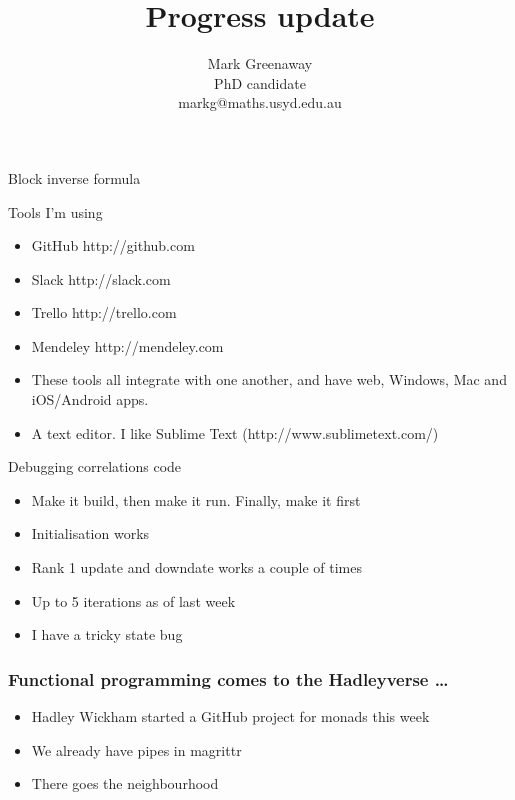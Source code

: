 \documentclass{beamer}
\title{Progress update}
\author{Mark Greenaway\\PhD candidate\\markg@maths.usyd.edu.au}
\begin{document}
\begin{frame}
\titlepage
\end{frame}

\begin{frame}{Block inverse formula}
\end{frame}

\begin{frame}{Tools I'm using}
\begin{itemize}
\item GitHub http://github.com
\item Slack http://slack.com
\item Trello http://trello.com
\item Mendeley http://mendeley.com
\item These tools all integrate with one another, and have web, Windows, Mac and iOS/Android apps.
\item A text editor. I like Sublime Text (http://www.sublimetext.com/)
\end{itemize}
\end{frame}

\begin{frame}{Debugging correlations code}
\begin{itemize}
\item Make it build, then make it run. Finally, make it first
\item Initialisation works
\item Rank 1 update and downdate works a couple of times
\item Up to 5 iterations as of last week
\item I have a tricky state bug
\end{itemize}
\end{frame}

\begin{frame}
\frametitle{Functional programming comes to the Hadleyverse \ldots}
\begin{itemize}
\item Hadley Wickham started a GitHub project for monads this week
\item We already have pipes in magrittr
\item There goes the neighbourhood
\end{itemize}
\end{frame}
\end{document}
